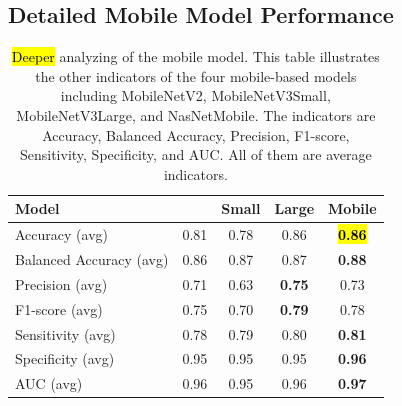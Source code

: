 \documentclass[sensors,article,accept,pdftex,moreauthors]{Definitions/mdpi}
\begin{document}
		\subsection[\appendixname~\thesection]{Detailed Mobile Model Performance}
		\begin{table}[H]
\caption{\hl{Deeper%
} analyzing of the mobile model. This table illustrates the other indicators of the four mobile-based models including MobileNetV2, MobileNetV3Small, MobileNetV3Large, and NasNetMobile. The indicators are Accuracy, Balanced Accuracy, Precision, F1-score, Sensitivity, Specificity, and AUC. All of them are average indicators.}
\label{appendix-table:mobile-performance}
\setlength{\tabcolsep}{4.7mm}\begin{tabular}{l  c  c  c  c} 
	\toprule
	\textbf{Model} & \textbf{\cite{04381}} & \textbf{\cite{02244} Small} & \textbf{\cite{02244} Large} & \textbf{\cite{07012} Mobile}\\
	\midrule
	Accuracy (avg) & 0.81 & 0.78 & 0.86 & \textbf{\hl{0.86}}\\
	\midrule
	Balanced Accuracy (avg) & 0.86 & 0.87 & 0.87 & \textbf{0.88}\\ 
	\midrule
	Precision (avg) & 0.71 & 0.63 & \textbf{0.75} & 0.73\\
	\midrule
	F1-score (avg) & 0.75 & 0.70 & \textbf{0.79} & 0.78\\
	\midrule
	Sensitivity (avg) & 0.78 & 0.79 & 0.80 & \textbf{0.81}\\ 
	\midrule
	Specificity (avg) & 0.95 & 0.95 & 0.95 & \textbf{0.96}\\
	\midrule
	AUC (avg) & 0.96 & 0.95 & 0.96 & \textbf{0.97}\\
	\bottomrule
\end{tabular}
		\end{table} 
		
\end{document}
